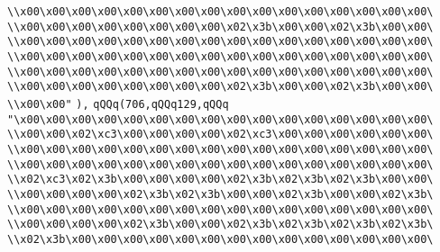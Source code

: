 \verb|\\x00\x00\x00\x00\x00\x00\x00\x00\x00\x00\x00\x00\x00\x00\x00\x00\|\newline
\verb|\\x00\x00\x00\x00\x00\x00\x00\x00\x02\x3b\x00\x00\x02\x3b\x00\x00\|\newline
\verb|\\x00\x00\x00\x00\x00\x00\x00\x00\x00\x00\x00\x00\x00\x00\x00\x00\|\newline
\verb|\\x00\x00\x00\x00\x00\x00\x00\x00\x00\x00\x00\x00\x00\x00\x00\x00\|\newline
\verb|\\x00\x00\x00\x00\x00\x00\x00\x00\x00\x00\x00\x00\x00\x00\x00\x00\|\newline
\verb|\\x00\x00\x00\x00\x00\x00\x00\x00\x02\x3b\x00\x00\x02\x3b\x00\x00\|\newline
\verb|\\x00\x00"|\newline
\verb|),|\newline
\verb|qQQq(706,qQQq129,qQQq|\newline
\verb|"\x00\x00\x00\x00\x00\x00\x00\x00\x00\x00\x00\x00\x00\x00\x00\x00\|\newline
\verb|\\x00\x00\x02\xc3\x00\x00\x00\x00\x02\xc3\x00\x00\x00\x00\x00\x00\|\newline
\verb|\\x00\x00\x00\x00\x00\x00\x00\x00\x00\x00\x00\x00\x00\x00\x00\x00\|\newline
\verb|\\x00\x00\x00\x00\x00\x00\x00\x00\x00\x00\x00\x00\x00\x00\x00\x00\|\newline
\verb|\\x02\xc3\x02\x3b\x00\x00\x00\x00\x02\x3b\x02\x3b\x02\x3b\x00\x00\|\newline
\verb|\\x00\x00\x00\x00\x02\x3b\x02\x3b\x00\x00\x02\x3b\x00\x00\x02\x3b\|\newline
\verb|\\x00\x00\x00\x00\x00\x00\x00\x00\x00\x00\x00\x00\x00\x00\x00\x00\|\newline
\verb|\\x00\x00\x00\x00\x02\x3b\x00\x00\x02\x3b\x02\x3b\x02\x3b\x02\x3b\|\newline
\verb|\\x02\x3b\x00\x00\x00\x00\x00\x00\x00\x00\x00\x00\x00\x00\x00\x00\|\newline
